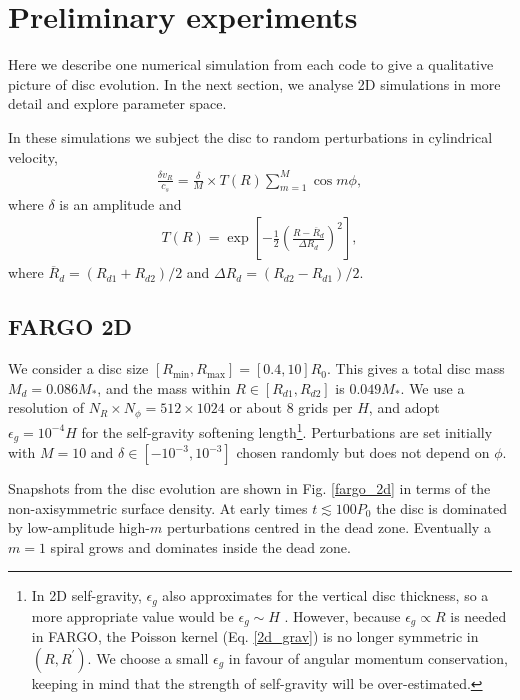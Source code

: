 
\section{Preliminary experiments}
Here we describe one numerical simulation from each code to give a
qualitative picture of disc evolution. In the next section, we analyse
2D simulations in more detail and explore parameter space.  

In these simulations we subject the disc to random perturbations in
cylindrical velocity,
\begin{align}\label{randpert}
  \frac{\delta v_R}{c_s} = \frac{\delta}{M}\times T(R) \sum_{m=1}^M\cos{m\phi},
\end{align}
where $\delta$ is an amplitude and 
\begin{align}
  T(R) =
  \exp{\left[-\frac{1}{2}\left(\frac{R-\overline{R}_d}{\Delta
          R_d}\right)^2\right]}, 
\end{align}
where $\overline{R}_d = (R_{d1}+R_{d2})/2$ and $\Delta R_d =
(R_{d2}-R_{d1})/2$. 
\subsection{FARGO 2D}\label{fargo_fiducial}
We consider a disc size $[R_\mathrm{min}, R_\mathrm{max}] =
[0.4,10]R_0$. This gives a total disc mass $M_{d}=0.086M_*$, and the
mass within $R\in[R_{d1},R_{d2}]$ is $0.049M_*$. 
We use a resolution of $N_R\times N_\phi = 512\times 1024$ or
about $8$ grids per $H$, and adopt $\epsilon_g=10^{-4}H$ for the 
self-gravity softening length\footnote{In 2D self-gravity, $\epsilon_g$ also
  approximates for the vertical disc thickness, so a more appropriate
  value would be $\epsilon_g\sim H$ \citep{muller12}. However, because
  $\epsilon_g\propto R$ is needed in FARGO, the Poisson kernel
  (Eq. \ref{2d_grav}) is no longer symmetric in $(R,R^\prime)$. We
  choose a small  
  $\epsilon_g$ in favour of angular momentum conservation, keeping in
  mind that the strength of self-gravity will be over-estimated.}.
Perturbations are set initially with $M=10$ and
$\delta\in[-10^{-3},10^{-3}]$ chosen randomly but does not depend
on $\phi$. 


Snapshots from the disc evolution are shown in Fig. \ref{fargo_2d} in
terms of the non-axisymmetric surface density. At early times
$t\lesssim100P_0$ the disc is dominated by low-amplitude high-$m$
perturbations centred in the dead zone. Eventually a $m=1$ spiral 
grows and dominates inside the dead zone.  

